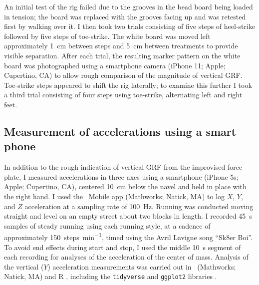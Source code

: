 An initial test of the rig failed due to the grooves in the bead board being loaded in tension; the board was replaced with the grooves facing up and was retested first by walking over it. I then took two trials consisting of five steps of heel-strike followed by five steps of toe-strike. The white board was moved left approximately \SI{1}{\centi\meter} between steps and \SI{5}{\centi\meter} between treatments to provide visible separation. After each trial, the resulting marker pattern on the white board was photographed using a smartphone camera (iPhone 11; Apple; Cupertino, CA) to allow rough comparison of the magnitude of vertical GRF. Toe-strike steps appeared to shift the rig laterally; to examine this further I took a third trial consisting of four steps using toe-strike, alternating left and right feet. 




\subsection{Measurement of accelerations using a smart phone}
In addition to the rough indication of vertical GRF from the improvised force plate, I measured accelerations in three axes using a smartphone (iPhone 5s; Apple; Cupertino, CA), centered \SI{10}{\centi\meter} below the navel and held in place with the right hand. I used the \Matlab\ Mobile app (Mathworks; Natick, MA) to log $X$, $Y$, and $Z$ acceleration at a sampling rate of \SI{100}{\hertz}.  Running was conducted moving straight and level on an empty street about two blocks in length. I recorded \SI{45}{\second} samples of steady running using each running style, at a cadence of approximately \SI{150}{steps\per\minute}, timed using the Avril Lavigne song ``Sk8er Boi''. To avoid end effects during start and stop, I used the middle \SI{10}{\second} segment of each recording for analyses of the acceleration of the center of mass. Analysis of the vertical ($Y$) acceleration measurements was carried out in \Matlab\ (Mathworks; Natick, MA) and R \cite{r2020}, including the \lstinline{tidyverse} and \lstinline{ggplot2} libraries \citep{wickham2019tidyverse}. 



